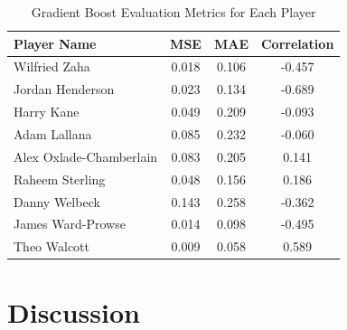 \documentclass[12pt]{article}
\begin{document}
\begin{table}[H]
  \centering
  \begin{tabular}{|l|c|c|c|}
  \hline
  \textbf{Player Name} & \textbf{MSE} & \textbf{MAE} & \textbf{Correlation} \\
  \hline
  Wilfried Zaha & 0.018 & 0.106 & -0.457 \\
  Jordan Henderson & 0.023 & 0.134 & -0.689 \\
  Harry Kane & 0.049 & 0.209 & -0.093 \\
  Adam Lallana & 0.085 & 0.232 & -0.060 \\
  Alex Oxlade-Chamberlain & 0.083 & 0.205 & 0.141 \\
  Raheem Sterling & 0.048 & 0.156 & 0.186 \\
  Danny Welbeck & 0.143 & 0.258 & -0.362 \\
  James Ward-Prowse & 0.014 & 0.098 & -0.495 \\
  Theo Walcott & 0.009 & 0.058 & 0.589 \\
  \hline
  \end{tabular}
  \caption{Gradient Boost Evaluation Metrics for Each Player}
  \label{tab:player_evaluation_metrics}
\end{table}






\section{Discussion}
\label{sec:disc}












 
\end{document}
